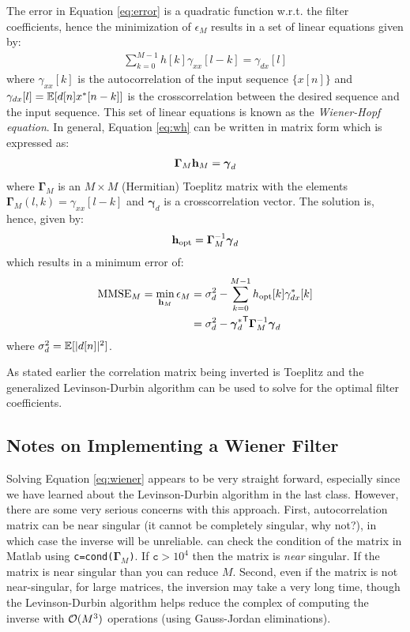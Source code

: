 \documentclass[12pt]{article}
\begin{document}
The error in Equation \eqref{eq:error} is a quadratic function w.r.t. the filter coefficients, hence the minimization of $\epsilon_M$ results in a set of linear equations given by:
\begin{align}
  \sum_{k=0}^{M-1} h[k] \gamma_{xx}[l-k] = \gamma_{dx}[l] \label{eq:wh}
\end{align}
where $\gamma_{xx}[k]$ is the autocorrelation of the input sequence $\{x[n]\}$ and $\gamma_{dx}[l] = {\mathbb E}[d[n]x^*[n-k]]$ is the crosscorrelation between the desired sequence and the input sequence. This set of linear equations is known as the {\em Wiener-Hopf equation}. In general, Equation \eqref{eq:wh} can be written in matrix form which is expressed as:
\begin{align}
  \boldsymbol{\Gamma}_M {\mathbf h}_{M} = \boldsymbol{\gamma}_d \nonumber
\end{align}
where $\boldsymbol{\Gamma}_M$ is an $M \times M$ (Hermitian) Toeplitz matrix with the elements $\boldsymbol{\Gamma}_M(l,k) = \gamma_{xx}[l-k]$ and $\boldsymbol{\gamma}_d$ is a crosscorrelation vector. The solution is, hence, given by: 
\begin{align}
  {\mathbf h}_{\textrm{opt}} = \boldsymbol{\Gamma}_M^{-1} \boldsymbol{\gamma}_d \label{eq:wiener}
\end{align}
which results in a minimum error of:  
\begin{align}
  \textrm{MMSE}_{M} = \min_{{\mathbf h}_M} \epsilon_M &= \sigma_d^2 - \sum_{k=0}^{M-1}h_{\textrm{opt}}[k] \gamma_{dx}^*[k] \nonumber\\
  &= \sigma_d^2 - {\boldsymbol{\gamma}_d^*}^{{\textsf{T}}} \boldsymbol{\Gamma}_M^{-1} \boldsymbol{\gamma}_d\nonumber
\end{align}
where $\sigma_d^2 = {\mathbb E}[|d[n]|^2]$.

As stated earlier the correlation matrix being inverted is Toeplitz and the generalized Levinson-Durbin algorithm can be used to solve for the optimal filter coefficients. 



\subsection{Notes on Implementing a Wiener Filter}
Solving Equation \eqref{eq:wiener} appears to be very straight forward, especially since we have learned about the Levinson-Durbin algorithm in the last class. However, there are some very serious concerns with this approach. First, autocorrelation matrix can be near singular (it cannot be completely singular, why not?), in which case the inverse will be unreliable. can check the condition of the matrix in Matlab using \texttt{c=cond($\boldsymbol{\Gamma}_M$)}. If $\texttt{c}>10^4$ then the matrix is {\em near} singular. If the matrix is near singular than you can reduce $M$. Second, even if the matrix is not near-singular, for large matrices, the inversion may take a very long time, though the Levinson-Durbin algorithm helps reduce the complex of computing the inverse with ${\mathcal O}(M^3)$ operations (using Gauss-Jordan eliminations). 
\end{document}
